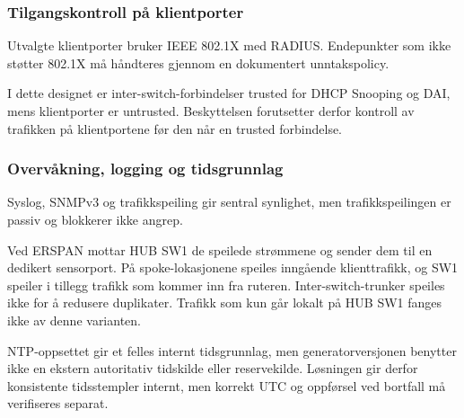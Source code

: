 \subsubsection{Tilgangskontroll på klientporter}
Utvalgte klientporter bruker IEEE 802.1X med RADIUS. Endepunkter som ikke støtter 802.1X må håndteres gjennom en dokumentert unntakspolicy.

I dette designet er inter-switch-forbindelser trusted for DHCP Snooping og DAI, mens klientporter er untrusted. Beskyttelsen forutsetter derfor kontroll av trafikken på klientportene før den når en trusted forbindelse.

\subsubsection{Overvåkning, logging og tidsgrunnlag}
Syslog, SNMPv3 og trafikkspeiling gir sentral synlighet, men trafikkspeilingen er passiv og blokkerer ikke angrep.

Ved ERSPAN mottar HUB SW1 de speilede strømmene og sender dem til en dedikert sensorport. På spoke-lokasjonene speiles inngående klienttrafikk, og SW1 speiler i tillegg trafikk som kommer inn fra ruteren. Inter-switch-trunker speiles ikke for å redusere duplikater. Trafikk som kun går lokalt på HUB SW1 fanges ikke av denne varianten.

NTP-oppsettet gir et felles internt tidsgrunnlag, men generatorversjonen benytter ikke en ekstern autoritativ tidskilde eller reservekilde. Løsningen gir derfor konsistente tidsstempler internt, men korrekt UTC og oppførsel ved bortfall må verifiseres separat.

